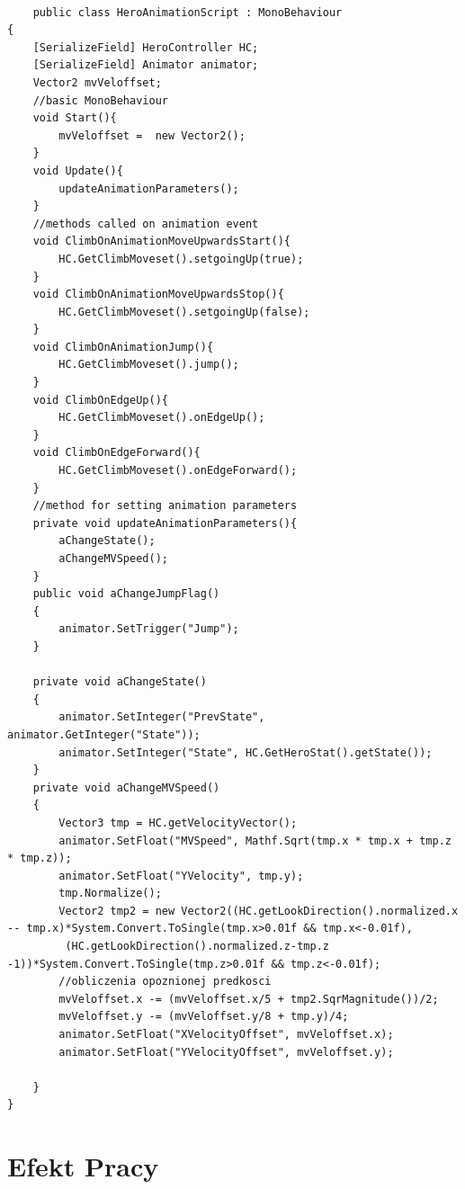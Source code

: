 \documentclass[12pt,twoside]{article}
\begin{document}
\begin{lstlisting}[language={[Sharp]C},caption=Skyrpt `HeroAnimationScript' ,label={HeroScript:HeroAnimationScript}]

    public class HeroAnimationScript : MonoBehaviour
{
    [SerializeField] HeroController HC;
    [SerializeField] Animator animator;
    Vector2 mvVeloffset;
    //basic MonoBehaviour
    void Start(){
        mvVeloffset =  new Vector2();
    }
    void Update(){ 
        updateAnimationParameters();
    }
    //methods called on animation event
    void ClimbOnAnimationMoveUpwardsStart(){
        HC.GetClimbMoveset().setgoingUp(true);
    }
    void ClimbOnAnimationMoveUpwardsStop(){
        HC.GetClimbMoveset().setgoingUp(false);
    }
    void ClimbOnAnimationJump(){
        HC.GetClimbMoveset().jump();
    }
    void ClimbOnEdgeUp(){
        HC.GetClimbMoveset().onEdgeUp();
    }
    void ClimbOnEdgeForward(){
        HC.GetClimbMoveset().onEdgeForward();
    }
    //method for setting animation parameters
    private void updateAnimationParameters(){
        aChangeState();
        aChangeMVSpeed();
    }
    public void aChangeJumpFlag()
    {
        animator.SetTrigger("Jump");
    }

    private void aChangeState()
    {
        animator.SetInteger("PrevState", animator.GetInteger("State"));
        animator.SetInteger("State", HC.GetHeroStat().getState());
    }
    private void aChangeMVSpeed()
    {
        Vector3 tmp = HC.getVelocityVector();
        animator.SetFloat("MVSpeed", Mathf.Sqrt(tmp.x * tmp.x + tmp.z * tmp.z));
        animator.SetFloat("YVelocity", tmp.y);
        tmp.Normalize();
        Vector2 tmp2 = new Vector2((HC.getLookDirection().normalized.x -- tmp.x)*System.Convert.ToSingle(tmp.x>0.01f && tmp.x<-0.01f),
         (HC.getLookDirection().normalized.z-tmp.z -1))*System.Convert.ToSingle(tmp.z>0.01f && tmp.z<-0.01f);
        //obliczenia opoznionej predkosci
        mvVeloffset.x -= (mvVeloffset.x/5 + tmp2.SqrMagnitude())/2;
        mvVeloffset.y -= (mvVeloffset.y/8 + tmp.y)/4;
        animator.SetFloat("XVelocityOffset", mvVeloffset.x);
        animator.SetFloat("YVelocityOffset", mvVeloffset.y);

    }
}

\end{lstlisting}
\clearpage

\section{Efekt Pracy}
\end{document}
